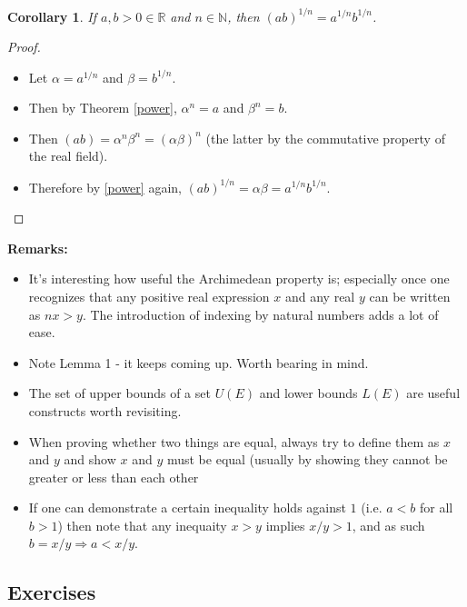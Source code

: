 \documentclass[12pt]{article}
\newtheorem{corollary}{Corollary}[theorem]
\newcommand{\R}{\mathbb{R}}
\newcommand{\N}{\mathbb{N}}
\begin{document}
\begin{corollary}
    
    If $a, b > 0 \in \R$ and $n \in \N$, then $(ab)^{1/n} = a^{1/n}b^{1/n}$.

\end{corollary}

\begin{proof}
    
    \begin{itemize}
        \item Let $\alpha = a^{1/n}$ and $\beta = b^{1/n}$.
        \item Then by Theorem \ref{power}, $\alpha^n = a$ and $\beta^n = b$.
        \item Then $(ab) = \alpha^n \beta^n = (\alpha \beta)^n$ (the latter by the commutative property of the real field).
        \item Therefore by \ref{power} again, $(ab)^{1/n} = \alpha \beta = a^{1/n} b^{1/n}$.
    \end{itemize}
      

\end{proof}

\textbf{Remarks:}

\begin{itemize}
    \item It's interesting how useful the Archimedean property is; especially once one recognizes that any positive real expression $x$ and any real $y$ can be written as $nx > y$. The introduction of indexing by natural numbers adds a lot of ease.
    \item Note Lemma 1 - it keeps coming up. Worth bearing in mind.
    \item The set of upper bounds of a set $U(E)$ and lower bounds $L(E)$ are useful constructs worth revisiting.
    \item When proving whether two things are equal, always try to define them as $x$ and $y$ and show $x$ and $y$ must be equal (usually by showing they cannot be greater or less than each other
    \item If one can demonstrate a certain inequality holds against $1$ (i.e. $a < b$ for all $b > 1$) then note that any inequaity $x > y$ implies $x/y > 1$, and as such $b = x/y \Rightarrow a < x/y$. 
\end{itemize}

\subsection{Exercises}
\end{document}
